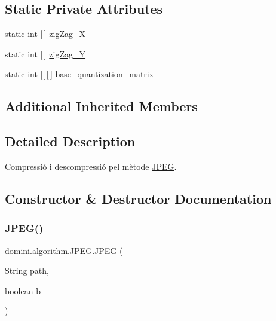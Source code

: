 \subsection*{Static Private Attributes}
\begin{DoxyCompactItemize}
\item 
static int \mbox{[}$\,$\mbox{]} \hyperlink{classdomini_1_1algorithm_1_1JPEG_a7d3829cbffd758c087341a8da13dd2ca}{zig\+Zag\+\_\+X}
\item 
static int \mbox{[}$\,$\mbox{]} \hyperlink{classdomini_1_1algorithm_1_1JPEG_ad886d8aa00a40cb151b446534f0d1bcc}{zig\+Zag\+\_\+Y}
\item 
static int \mbox{[}$\,$\mbox{]}\mbox{[}$\,$\mbox{]} \hyperlink{classdomini_1_1algorithm_1_1JPEG_a1f91c0bad6cfd3ac22bec68bc28564c5}{base\+\_\+quantization\+\_\+matrix}
\end{DoxyCompactItemize}
\subsection*{Additional Inherited Members}


\subsection{Detailed Description}
Compressió i descompressió pel mètode \hyperlink{classdomini_1_1algorithm_1_1JPEG}{J\+P\+EG}. 

\subsection{Constructor \& Destructor Documentation}
\mbox{\label{classdomini_1_1algorithm_1_1JPEG_ac489916de8505f11b6e29c7206baf3c7}} 
\subsubsection{\texorpdfstring{J\+P\+E\+G()}{JPEG()}\hspace{0.1cm}{\footnotesize\ttfamily [1/2]}}
{\footnotesize\ttfamily domini.\+algorithm.\+J\+P\+E\+G.\+J\+P\+EG (\begin{DoxyParamCaption}\item[{String}]{path,  }\item[{boolean}]{b }\end{DoxyParamCaption})\hspace{0.3cm}{\ttfamily [inline]}}



